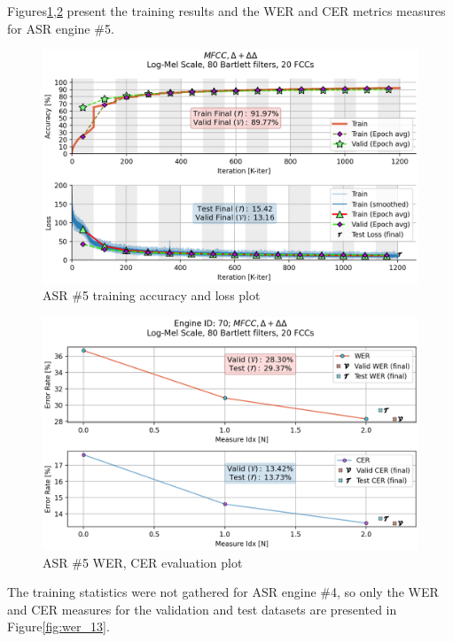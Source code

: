 Figures\;\ref{fig:asr_70},\;\ref{fig:wer_70}
present the training results and the WER and CER
metrics measures for ASR engine \#5.

\begin{figure}[H]
    \centering
    \includegraphics[width=0.95\linewidth]{Experiments/images/asr_70}
    \caption{ASR \#5 training accuracy and loss plot}\label{fig:asr_70}
\end{figure}

\begin{figure}[H]
    \centering
    \includegraphics[width=0.95\linewidth]{ASR/images/asr70_wer.png}
    \caption{ASR \#5 WER, CER evaluation plot}\label{fig:wer_70}
\end{figure}

The training statistics were not gathered for ASR engine \#4,
so only the WER and CER measures for the validation
and test datasets are presented in Figure\;\ref{fig:wer_13}.

